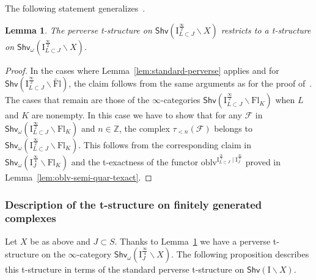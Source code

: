 \documentclass[11pt]{amsart}
\numberwithin{equation}{section}
\theoremstyle{plain}
\newtheorem{lem}[thm]{Lemma}
\theoremstyle{definition}
\newcommand{\sF}{{\mathcal F}}
\newcommand{\I}{{\mathrm I}}
\newcommand{\Z}{{\mathbb Z}}
\newcommand{\semi}{{{\frac{\infty}{2}}}}
\newcommand{\quar}{{{\frac{\infty}{4}}}}
\newcommand{\oblv}{\mathrm{oblv}}
\newcommand{\Shv}{\mathsf{Shv}}
\newcommand{\Shvfg}{\mathsf{Shv}_{\mathrm{fg}}}
\newcommand{\Ras}{\mathrm{Ras}}
\newcommand{\Fl}{\mathrm{Fl}}
\newcommand{\tFl}{\widetilde{\Fl}}
\begin{document}


The following statement generalizes~\cite[Lemma~6.10]{adr}.

\begin{lem}
\label{lem:tstr-fg-objects}
The perverse t-structure on $\Shv\left(\I_{L\subset J}^{\semi} \backslash X\right)$ restricts to a t-structure on $\Shv_\omega\left(\I_{L\subset J}^{\semi} \backslash X\right)$. 
\end{lem}

\begin{proof}
In the cases where Lemma~\ref{lem:standard-perverse} applies and for $\Shv \left( \I^\semi_{L \subset J} \backslash \tFl \right)$, the claim follows from the same arguments as for the proof of~\cite[Lemma~6.10]{adr}. The cases that remain are those of the $\infty$-categories $\Shv\left(\I_{L\subset J}^{\semi} \backslash \Fl_K \right)$ when $L$ and $K$ are nonempty. In this case we have to show that for any $\sF$ in $\Shv_\omega\left(\I_{L\subset J}^{\semi} \backslash \Fl_K \right)$ and $n \in \Z$, the complex $\tau_{<n}(\sF)$ belongs to $\Shv_\omega\left(\I_{L\subset J}^{\semi} \backslash \Fl_K \right)$. This follows from the corresponding claim in $\Shv_\omega\left(\I_{J}^{\quar} \backslash \Fl_K \right)$ and the t-exactness of the functor $\oblv^{\I_{L\subset J}^{\semi} \mid \I_J^\quar}$ proved in Lemma~\ref{lem:oblv-semi-quar-texact}.
\end{proof}

\subsubsection{Description of the t-structure on finitely generated complexes} 

Let $X$ be as above and $J \subset S$.
Thanks to Lem\-ma~\ref{lem:tstr-fg-objects} we have a perverse t-structure on the $\infty$-category $\Shv_\omega\left(\I_{J}^{\quar} \backslash X\right)$.
The following proposition describes this t-structure in terms of the standard perverse t-structure on $\Shv(\I\backslash X)$.
\end{document}
